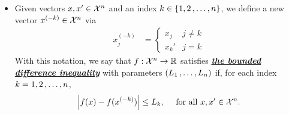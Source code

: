 \documentclass[11pt]{article}
\begin{document}
\begin{itemize}
\item \begin{remark}
Given vectors $x, x' \in {\mathcal X}^n$ and an index $k \in \left\{1, 2 \,{,}\ldots{,}\, n\right\}$, we define a new vector $x^{(-k)} \in {\mathcal X}^n$ via
\begin{align*}
x_j^{(-k)} &= \left\{\begin{array}{cc}
x_j & j \neq k\\
x_k'& j = k
\end{array}
\right.
\end{align*}
With this notation, we say that $f: {\mathcal X}^n \to {\mathbb R}$ satisfies \underline{\textbf{\emph{the bounded difference inequality}}} with parameters $(L_1 \,{,}\ldots{,}\, L_n)$ if, for each index $k = 1, 2 \,{,}\ldots{,}\, n$,
\begin{align}
\left\lvert f(x) - f(x^{(-k)}) \right\rvert \le L_k, \quad\text{ for all }x, x' \in {\mathcal X}^n. \label{eqn: bounded_difference_property}
\end{align}
\end{remark}


\end{itemize}
\end{document}
